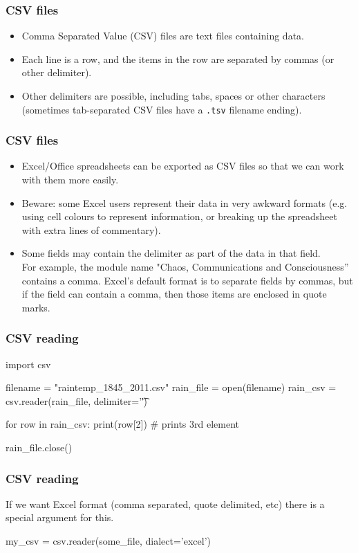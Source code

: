 \documentclass{beamer}
\begin{document}
\begin{frame}[fragile]
\frametitle{CSV files}
\begin{itemize}
\item Comma Separated Value (CSV) files are text files containing data. 

\item Each line is a row, and the items in the row are separated by commas (or other delimiter).

\item Other delimiters are possible, including tabs, spaces or other characters (sometimes tab-separated CSV files have a \texttt{.tsv} filename ending).
\end{itemize}
\end{frame}


\begin{frame}[fragile]
\frametitle{CSV files}
\begin{itemize}
\item Excel/Office spreadsheets can be exported as CSV files so that we can work with them more easily.

\item Beware: some Excel users represent their data in very awkward formats (e.g. using cell colours to represent information, or breaking up the spreadsheet with extra lines of commentary).

\item Some fields may contain the delimiter as part of the data in that field. \\For example, the module name "Chaos, Communications and Consciousness'' contains a comma. Excel's default format is to separate fields by commas, but if the field can contain a comma, then those items are enclosed in quote marks.
\end{itemize}
\end{frame}

\begin{frame}[fragile]
\frametitle{CSV reading}
\begin{code}
import csv

filename = "raintemp_1845_2011.csv"
rain_file = open(filename)
rain_csv = csv.reader(rain_file, delimiter='\t')

for row in rain_csv:
    print(row[2])  # prints 3rd element

rain_file.close()
\end{code}
\end{frame}

\begin{frame}[fragile]
\frametitle{CSV reading}
If we want Excel format (comma separated, quote delimited, etc) there is a special argument for this.

\bigskip

\begin{code}
my_csv = csv.reader(some_file, dialect='excel')
\end{code}
\end{frame}
\end{document}
